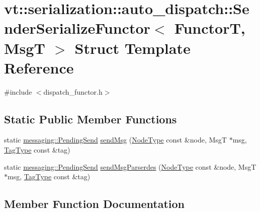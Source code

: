 \hypertarget{structvt_1_1serialization_1_1auto__dispatch_1_1_sender_serialize_functor}{}\section{vt\+:\+:serialization\+:\+:auto\+\_\+dispatch\+:\+:Sender\+Serialize\+Functor$<$ FunctorT, MsgT $>$ Struct Template Reference}
\label{structvt_1_1serialization_1_1auto__dispatch_1_1_sender_serialize_functor}


{\ttfamily \#include $<$dispatch\+\_\+functor.\+h$>$}

\subsection*{Static Public Member Functions}
\begin{DoxyCompactItemize}
\item 
static \hyperlink{structvt_1_1messaging_1_1_pending_send}{messaging\+::\+Pending\+Send} \hyperlink{structvt_1_1serialization_1_1auto__dispatch_1_1_sender_serialize_functor_a1216512465429855548fae3f61991313}{send\+Msg} (\hyperlink{namespacevt_a866da9d0efc19c0a1ce79e9e492f47e2}{Node\+Type} const \&node, MsgT $\ast$msg, \hyperlink{namespacevt_a84ab281dae04a52a4b243d6bf62d0e52}{Tag\+Type} const \&tag)
\item 
static \hyperlink{structvt_1_1messaging_1_1_pending_send}{messaging\+::\+Pending\+Send} \hyperlink{structvt_1_1serialization_1_1auto__dispatch_1_1_sender_serialize_functor_a43be60ab9baf2f5de77cbb246b326e03}{send\+Msg\+Parserdes} (\hyperlink{namespacevt_a866da9d0efc19c0a1ce79e9e492f47e2}{Node\+Type} const \&node, MsgT $\ast$msg, \hyperlink{namespacevt_a84ab281dae04a52a4b243d6bf62d0e52}{Tag\+Type} const \&tag)
\end{DoxyCompactItemize}


\subsection{Member Function Documentation}
\mbox{\label{structvt_1_1serialization_1_1auto__dispatch_1_1_sender_serialize_functor_a1216512465429855548fae3f61991313}} 
